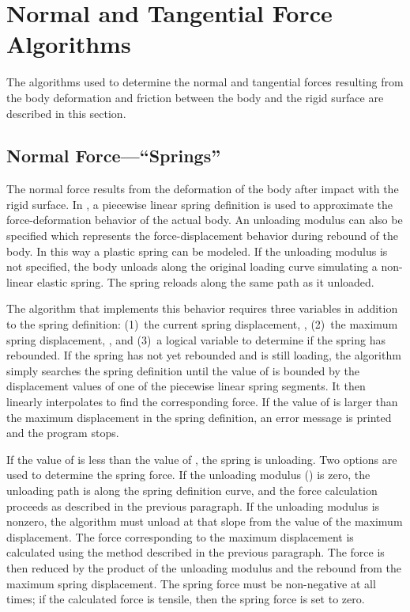 \section{Normal and Tangential Force Algorithms}
The algorithms used to determine the normal and tangential forces
resulting from the body deformation and friction between the body and
the rigid surface are described in this section. 

\subsection{Normal Force---``Springs''}
The normal force results from the deformation of the body after impact
with the rigid surface.  In \SLAP, a piecewise linear spring
definition is used to approximate the force-deformation behavior of
the actual body.  An unloading modulus can also be specified which
represents the force-displacement behavior during rebound of the body.
In this way a plastic spring can be modeled. If the unloading modulus
is not specified, the body unloads along the original loading curve
simulating a non-linear elastic spring.  The spring reloads along
the same path as it unloaded. 

The algorithm that implements this behavior requires three variables
in addition to the spring definition: (1)~the current spring
displacement, , (2)~the maximum spring displacement,
, and (3)~a logical variable to determine if the spring
has rebounded.  If the spring has not yet rebounded and is still
loading, the algorithm simply searches the spring definition until the
value of  is bounded by the displacement values of one of
the piecewise linear spring segments.  It then linearly interpolates
to find the corresponding force.  If the value of  is larger
than the maximum displacement in the spring definition, an error
message is printed and the program stops. 

If the value of  is less than the value of , the
spring is unloading.  Two options are used to determine the spring
force.  If the unloading modulus () is zero, the unloading
path is along the spring definition curve, and the force calculation
proceeds as described in the previous paragraph.  If the unloading
modulus is nonzero, the algorithm must unload at that slope from the
value of the maximum displacement.  The force corresponding to the
maximum displacement  is calculated using the method
described in the previous paragraph.  The force is then reduced by the
product of the unloading modulus and the rebound from the maximum
spring displacement.  The spring force must be non-negative at all
times; if the calculated force is tensile, then the spring force is
set to zero.

